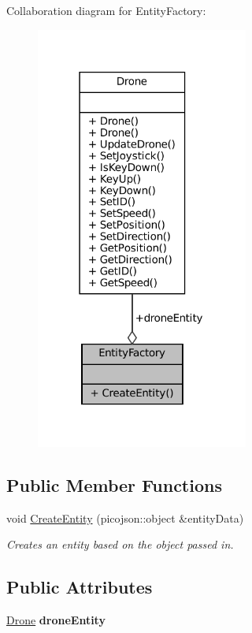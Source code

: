 Collaboration diagram for Entity\+Factory\+:\nopagebreak
\begin{figure}[H]
\begin{center}
\leavevmode
\includegraphics[width=198pt]{classEntityFactory__coll__graph}
\end{center}
\end{figure}
\subsection*{Public Member Functions}
\begin{DoxyCompactItemize}
\item 
\mbox{\label{classEntityFactory_a4be383d4c4efb17ae4cff9c27b84c47c}} 
void \hyperlink{classEntityFactory_a4be383d4c4efb17ae4cff9c27b84c47c}{Create\+Entity} (picojson\+::object \&entity\+Data)
\begin{DoxyCompactList}\small\item\em Creates an entity based on the object passed in. \end{DoxyCompactList}\end{DoxyCompactItemize}
\subsection*{Public Attributes}
\begin{DoxyCompactItemize}
\item 
\mbox{\label{classEntityFactory_a467ebf6906f2410bf3574f29c4c0de61}} 
\hyperlink{classDrone}{Drone} {\bfseries drone\+Entity}
\end{DoxyCompactItemize}


